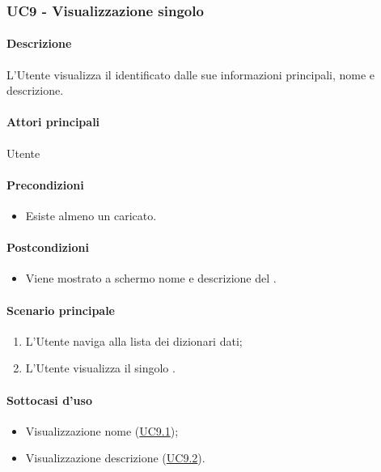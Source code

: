 \subsubsection{UC9 - Visualizzazione singolo }\label{UC9}
\paragraph*{Descrizione}
L’Utente visualizza il  identificato dalle sue informazioni principali, nome e descrizione.

\paragraph*{Attori principali}
Utente

\paragraph*{Precondizioni}
\begin{itemize}
  \item Esiste almeno un  caricato.  
\end{itemize}

\paragraph*{Postcondizioni}
\begin{itemize}
  \item Viene mostrato a schermo nome e descrizione del .
\end{itemize}

\paragraph*{Scenario principale}
\begin{enumerate}
  \item L’Utente naviga alla lista dei dizionari dati;
  \item L’Utente visualizza il singolo .
\end{enumerate}

\paragraph*{Sottocasi d'uso}
\begin{itemize}
  \item Visualizzazione nome  (\hyperref[UC9point1]{UC9.1});
  \item Visualizzazione descrizione  (\hyperref[UC9point2]{UC9.2}).
\end{itemize}

